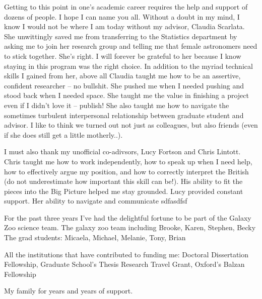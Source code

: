 

Getting to this point in one's academic career requires the help and support of dozens of people. I hope I can name you all. Without a doubt in my mind, I know I would not be where I am today without my advisor, Claudia Scarlata.  She unwittingly saved me from transferring to the Statistics department by asking me to join her research group and telling me that female astronomers need to stick together. She's right. I will forever be grateful to her because I know staying in this program was the right choice. In addition to the myriad technical skills I gained from her, above all Claudia taught me how to be an assertive, confident researcher -- no bullshit.  She pushed me when I needed pushing and stood back when I needed space. She taught me the value in finishing a project even if I didn't love it -- publish! She also taught me how to navigate the sometimes turbulent interpersonal relationship between graduate student and advisor. I like to think we turned out not just as colleagues, but also friends (even if she does still get a little motherly..).  

I must also thank my unofficial co-adivsors, Lucy Fortson and Chris Lintott.  Chris taught me how to work independently, how to speak up when I need help,  how to effectively argue my position, and how to correctly interpret the British (do not underestimate how important this skill can be!). His ability to fit the pieces into the Big Picture helped me stay grounded. Lucy provided constant support. Her ability to navigate and communicate sdfasdfsf


For the past three years I've had the delightful fortune to be part of the Galaxy Zoo science team. 
The galaxy zoo team including Brooke, Karen, Stephen, Becky
The grad students: Micaela, Michael, Melanie, Tony, Brian

All the institutions that have contributed to funding me: Doctoral Dissertation Fellowship, Graduate School's Thesis Research Travel Grant, Oxford's Balzan Fellowship

My family for years and years of support. 





